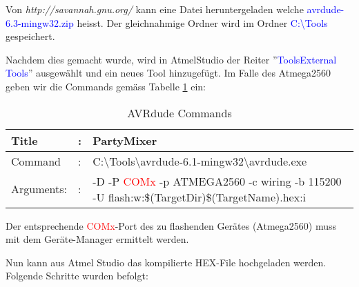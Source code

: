 Von \textit{http://savannah.gnu.org/} kann eine Datei heruntergeladen welche \textcolor{blue}{avrdude-6.3-mingw32.zip} heisst. Der gleichnahmige Ordner wird im Ordner \textcolor{blue}{C:\textbackslash Tools} gespeichert. \cite{savannahgnuorg_index_2016}

Nachdem dies gemacht wurde, wird in AtmelStudio der Reiter ''\textcolor{blue}{Tools\textrightarrow External Tools}'' ausgewählt und ein neues Tool hinzugefügt. Im Falle des Atmega2560 geben wir die Commands gemäss Tabelle \ref{tab:AVRdude_commands} ein:


\begin{table}[h!]
\center
\begin{tabularx}{\textwidth}{|l|l|X|}
\hline
Title & : & PartyMixer \\
\hline
Command & : & C:\textbackslash Tools\textbackslash avrdude-6.1-mingw32\textbackslash avrdude.exe \\
\hline
Arguments: & : & -D -P \textcolor{red}{ COMx} -p ATMEGA2560 -c wiring -b 115200 -U flash:w:\$(TargetDir)\$(TargetName).hex:i\\
\hline
\end{tabularx}
\caption{AVRdude Commands}
\label{tab:AVRdude_commands}
\end{table}

Der entsprechende \textcolor{red}{ COMx}-Port des zu flashenden Gerätes (Atmega2560) muss mit dem Geräte-Manager ermittelt werden. \cite{meier_mc1-skript_2017}

Nun kann aus Atmel Studio das kompilierte HEX-File hochgeladen werden.
\newpage
Folgende Schritte wurden befolgt:

